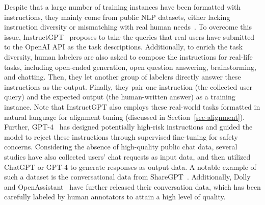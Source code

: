 Despite that a large number of training instances have been formatted with instructions, they mainly come from public NLP datasets, either lacking instruction diversity or mismatching with real human needs~\cite{Ouyang-arxiv-2022-Training}.   
To overcome this issue, InstructGPT~\cite{Ouyang-arxiv-2022-Training} proposes to take the queries that real users have submitted to the OpenAI API as the task descriptions.  %
Additionally, to enrich the task diversity, human labelers are also asked to compose the instructions for real-life tasks, including open-ended generation, open question answering, brainstorming, and chatting. 
Then, they let another group of labelers directly answer these instructions as the output.
Finally, they pair one instruction (\ie the collected user query) and the expected output  (\ie the human-written answer) as a training instance.
Note that InstructGPT also employs these real-world tasks formatted in natural language for alignment tuning (discussed in Section~\ref{sec-alignment}). 
Further, GPT-4~\cite{OpenAI-OpenAI-2023-GPT-4} has designed potentially high-risk instructions and guided the model to reject these instructions through supervised fine-tuning for safety concerns. 
{Considering the absence of high-quality public chat data, several studies have also collected  users' chat requests as input data,  and then utilized ChatGPT or GPT-4 to generate responses as output data. A notable example of such a dataset is the conversational data from ShareGPT~\cite{ShareGPT}. Additionally, Dolly~\cite{Conover-2023-arxiv-Dolly} and OpenAssistant~\cite{kopf-arxiv-2023-openassistant} have further released their conversation data, which has been carefully labeled by human annotators to attain a high level of quality.}




